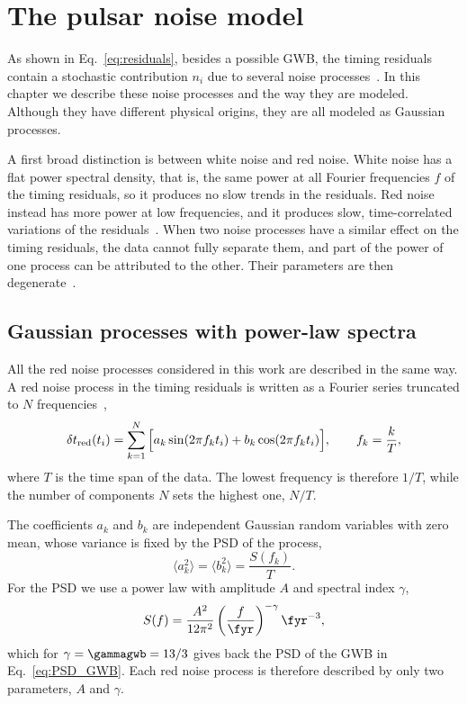 \chapter{The pulsar noise model} \label{chpt:rumore}

As shown in Eq.~\eqref{eq:residuals}, besides a possible GWB, the timing
residuals contain a stochastic contribution $n_i$ due to several noise
processes~\cite{Lentati2016,Shaifullah2025}.
In this chapter we describe these noise processes and the way they are modeled.
Although they have different physical origins, they are all modeled as
Gaussian processes.

A first broad distinction is between white noise and red noise. White noise
has a flat power spectral density, that is, the same power at all Fourier
frequencies $f$ of the timing residuals, so it produces no slow trends in the
residuals. Red noise instead has more power at low
frequencies, and it produces slow, time-correlated variations of the
residuals~\cite{Taylor2021}. When two noise processes have a
similar effect on the timing residuals, the data cannot fully separate them,
and part of the power of one process can be attributed to the other. Their
parameters are then degenerate~\cite{Shaifullah2025,Ferranti2025}.

\section{Gaussian processes with power-law spectra} \label{sec:modello_comune}

All the red noise processes considered in this work are described in the same
way. A red noise process in the timing residuals is written as a Fourier series
truncated to $N$ frequencies~\cite{Taylor2021},
\begin{equation}
    \delta t_{\rm red}(t_i) = \sum_{k=1}^{N} \Big[ a_k \sin(2\pi f_k t_i)
    + b_k \cos(2\pi f_k t_i) \Big],
    \qquad f_k = \frac{k}{T},
    \label{eq:fourier}
\end{equation}
where $T$ is the time span of the data. The lowest frequency is therefore
$1/T$, while the number of components $N$ sets the highest one, $N/T$.

The coefficients $a_k$ and $b_k$ are independent Gaussian random variables
with zero mean, whose variance is fixed by the PSD of the process,
\begin{equation}
    \langle a_k^2 \rangle = \langle b_k^2 \rangle = \frac{S(f_k)}{T}.
    \label{eq:varianza_coeff}
\end{equation}
For the PSD we use a power law with amplitude $A$ and spectral index $\gamma$,
\begin{equation}
    S(f) = \frac{A^2}{12\pi^2}\left(\frac{f}{\fyr}\right)^{-\gamma}\fyr^{-3},
    \label{eq:PSD_powerlaw}
\end{equation}
which for $\gamma = \gammagwb = 13/3$ gives back the PSD of the GWB in
Eq.~\eqref{eq:PSD_GWB}. Each red noise process is therefore described by only
two parameters, $A$ and $\gamma$.

